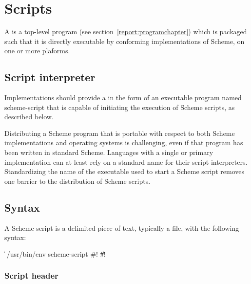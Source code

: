 \chapter{Scripts}
\label{scriptappendix}

A  is a top-level program 
(see section~\ref{report:programchapter}) which is packaged such that 
it is directly executable by conforming implementations of Scheme, on 
one or more plaforms.

\section{Script interpreter}

Implementations should provide a  in 
the form of an executable program named {\cf scheme-script} that is 
capable of initiating the execution of Scheme scripts, as described 
below.

\begin{rationale}
Distributing a Scheme program that is portable with respect to both 
Scheme implementations and operating systems is challenging, even 
if that program has been written in standard Scheme.  Languages with 
a single or primary implementation can at least rely on a standard 
name for their script interpreters.  Standardizing the name of the 
executable used to start a Scheme script removes one barrier to the 
distribution of Scheme scripts.
\end{rationale}

\section{Syntax}
\label{scriptsyntaxsection}

A Scheme script is a delimited piece of text, typically a file, with 
the following syntax:

\begin{grammar}
 \:  
  \> \| 
 \:  /usr/bin/env  
  \> scheme-script 
 \: \#! \| \#! 
\end{grammar}

\subsection{Script header}

